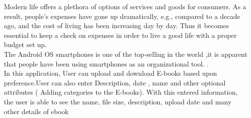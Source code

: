 \begin{Large}
\end{Large}
\vskip 0.1in Modern life offers a plethora of options of services and goods for consumers. As a 
result, people’s expenses have gone up dramatically, e.g., compared to a decade ago, and the 
cost of living has been increasing day by day. Thus it becomes essential to keep a check on expenses in order to live a good life with a proper budget set up.  \\

\noindent The Android OS smartphones is one of the top-selling  in the world ,it is apparent that people have been using smartphones as an organizational tool. .\\

\noindent In this application, User can upload and download E-books based upon preference.User can also enter
Description, date , name  and other optional attributes ( Adding categories  to the E-books). With this entered information, the user is able to see the name, file size, description, upload date and many other details of ebook 